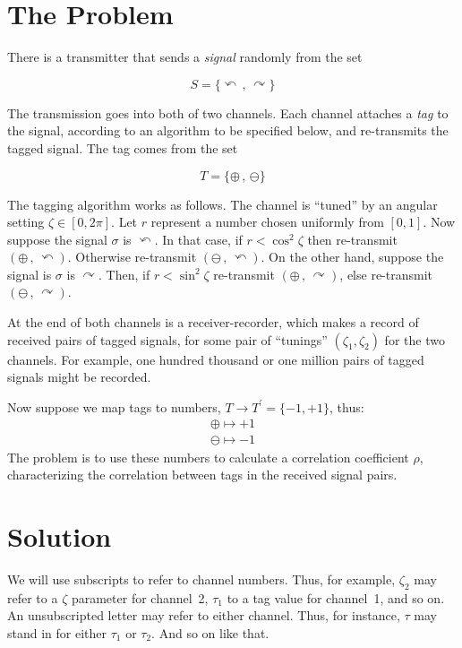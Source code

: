 \documentclass[9pt,technote]{IEEEtran}
\begin{document}
\section{The Problem}

There is a transmitter that sends a {\em{signal}} randomly from the
set

\begin{equation}
  S=\{\curvearrowleft\,,\,\curvearrowright\}
\end{equation}

The transmission goes into both of two channels. Each channel attaches
a {\em{tag}} to the signal, according to an algorithm to be specified
below, and re-transmits the tagged signal. The tag comes from the set

\begin{equation}
  T=\{\oplus\,,\,\ominus\}
\end{equation}

The tagging algorithm works as follows. The channel is ``tuned'' by an
angular setting $\zeta\in[0,2\pi]$. Let $r$ represent a number chosen
uniformly from $[0,1]$. Now suppose the signal $\sigma$ is
$\curvearrowleft$. In that case, if $r < \cos^2 \zeta$ then
re-transmit $(\oplus\,,\,\curvearrowleft)$. Otherwise re-transmit
$(\ominus\,,\,\curvearrowleft)$. On the other hand, suppose the signal
is $\sigma$ is $\curvearrowright$. Then, if $r < \sin^2 \zeta$
re-transmit $(\oplus\,,\,\curvearrowright)$, else re-transmit
$(\ominus\,,\,\curvearrowright)$.

At the end of both channels is a receiver-recorder, which makes a
record of received pairs of tagged signals, for some pair of
``tunings'' $(\zeta_1,\zeta_2)$ for the two channels. For example, one
hundred thousand or one million pairs of tagged signals might be
recorded.

Now suppose we map tags to numbers, $T\to T^{\prime}=\{-1,+1\}$, thus:
\begin{align}
  \oplus \mapsto +1 \\
  \ominus \mapsto -1
\end{align}
The problem is to use these numbers to calculate a correlation
coefficient $\rho$, characterizing the correlation between tags in the
received signal pairs.

\section{Solution}

We will use subscripts to refer to channel numbers. Thus, for example,
$\zeta_2$ may refer to a $\zeta$ parameter for channel~2, $\tau_1$ to
a tag value for channel~1, and so on. An unsubscripted letter may
refer to either channel. Thus, for instance, $\tau$ may stand in for
either $\tau_1$ or $\tau_2$. And so on like that.
\end{document}
